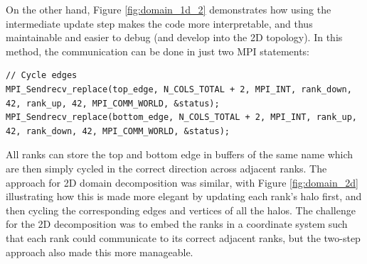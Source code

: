 \documentclass[12pt]{article}
\begin{document}
On the other hand, Figure \ref{fig:domain_1d_2} demonstrates how using the intermediate update step makes the code more interpretable,
and thus maintainable and easier to debug (and develop into the 2D topology).
In this method, the communication can be done in just two MPI statements:

\begin{lstlisting}
// Cycle edges
MPI_Sendrecv_replace(top_edge, N_COLS_TOTAL + 2, MPI_INT, rank_down, 42, rank_up, 42, MPI_COMM_WORLD, &status);
MPI_Sendrecv_replace(bottom_edge, N_COLS_TOTAL + 2, MPI_INT, rank_up, 42, rank_down, 42, MPI_COMM_WORLD, &status);
\end{lstlisting}

All ranks can store the top and bottom edge in buffers of the same name which are then simply cycled in the correct direction across adjacent ranks.
The approach for 2D domain decomposition was similar, with Figure \ref{fig:domain_2d} illustrating how this is made more elegant by updating each rank's halo first,
and then cycling the corresponding edges and vertices of all the halos.
The challenge for the 2D decomposition was to embed the ranks in a coordinate system such that each rank could communicate to its correct adjacent ranks,
but the two-step approach also made this more manageable.
\end{document}
